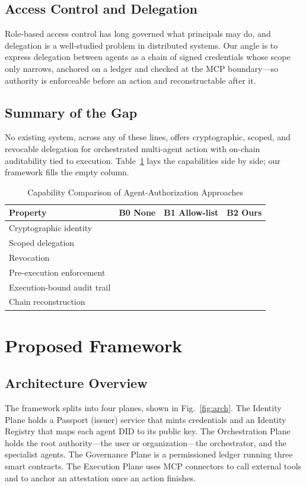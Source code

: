 \documentclass[conference]{IEEEtran}
\newcommand{\cmark}{\ding{51}}
\newcommand{\xmark}{\ding{55}}
\begin{document}
\subsection{Access Control and Delegation}
Role-based access control \cite{rbac1996} has long governed what principals may do, and delegation is a well-studied problem in distributed systems. Our angle is to express delegation between agents as a chain of signed credentials whose scope only narrows, anchored on a ledger and checked at the MCP boundary---so authority is enforceable before an action and reconstructable after it.

\subsection{Summary of the Gap}
No existing system, across any of these lines, offers cryptographic, scoped, and revocable delegation for orchestrated multi-agent action with on-chain auditability tied to execution. Table~\ref{tab:cap} lays the capabilities side by side; our framework fills the empty column.

\begin{table}[t]
\centering
\caption{Capability Comparison of Agent-Authorization Approaches}
\label{tab:cap}
\renewcommand{\arraystretch}{1.25}
\begin{tabular}{@{}lccc@{}}
\toprule
\textbf{Property} & \textbf{B0 None} & \textbf{B1 Allow-list} & \textbf{B2 Ours}\\
\midrule
Cryptographic identity      & \xmark & \xmark & \cmark\\
Scoped delegation           & \xmark & \xmark & \cmark\\
Revocation                  & \xmark & \xmark & \cmark\\
Pre-execution enforcement   & \xmark & \cmark & \cmark\\
Execution-bound audit trail & \xmark & \cmark & \cmark\\
Chain reconstruction        & \xmark & \xmark & \cmark\\
\bottomrule
\end{tabular}
\end{table}

\section{Proposed Framework}\label{sec:fw}
\subsection{Architecture Overview}
The framework splits into four planes, shown in Fig.~\ref{fig:arch}. The Identity Plane holds a Passport (issuer) service that mints credentials and an Identity Registry that maps each agent DID to its public key. The Orchestration Plane holds the root authority---the user or organization---the orchestrator, and the specialist agents. The Governance Plane is a permissioned ledger running three smart contracts. The Execution Plane uses MCP connectors to call external tools and to anchor an attestation once an action finishes.
\end{document}
